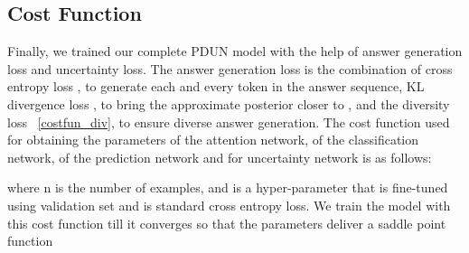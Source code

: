 \documentclass[review]{elsarticle}
\begin{document}
\subsection{Cost Function} \label{costfun_ale}




Finally, we trained our complete PDUN model with the help of answer generation loss and uncertainty loss. The answer generation loss  is the combination of cross entropy loss , to generate each and every token in the answer sequence, KL divergence loss , to bring the approximate posterior closer to , and the diversity loss  ~\ref{costfun_div}, to ensure diverse answer generation.  The cost function used for obtaining the parameters  of the attention network,  of the classification network,  of the prediction network and  for uncertainty network is as follows:

where n is the number of examples, and  is a hyper-parameter that is fine-tuned using validation set and  is standard cross entropy loss.
We train the model with this cost function till it converges so that the parameters  deliver a saddle point function
\end{document}
